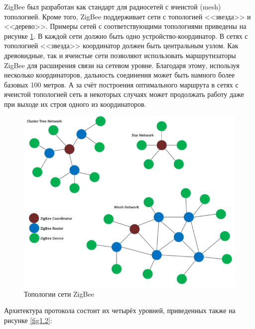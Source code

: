 	ZigBee был разработан как стандарт для радиосетей с ячеистой (mesh) топологией.
	Кроме того, ZigBee поддерживает сети с топологией <<звезда>> и <<дерево>>. 
	Примеры сетей с соответствующими топологиями приведены на рисунке \ref{fig1.1}. В каждой 
	сети должно быть одно устройство-координатор. В сетях с топологией <<звезда>> координатор должен 
	быть центральным узлом. Как древовидные, так и ячеистые сети позволяют использовать маршрутизаторы 
	ZigBee для расширения связи на сетевом уровне. Благодаря этому, используя несколько координаторов,
	дальность соединения может быть намного более базовых 100 метров. А за счёт построения оптимального
	маршрута в сетях с ячеистой топологией сеть в некоторых случаях может продолжать работу даже
	при выходе их строя одного из координаторов. \newline
	
	\begin{figure}[h]
		\centering
		\includegraphics[scale=0.6]{resources/ZigBee-network-topologies}
		\caption{Топологии сети ZigBee}
		\label{fig1.1}
	\end{figure}

	Архитектура протокола состоит их четырёх уровней, приведенных также на рисунке \ref{fig1.2}:
	
